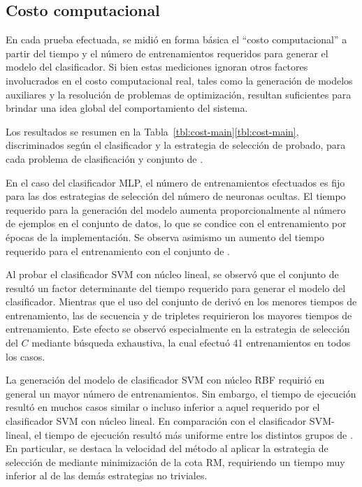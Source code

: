 %
%
\subsection{Costo computacional}
%
En cada prueba efectuada, se midió en forma básica el ``costo
computacional'' a partir del tiempo y el número de entrenamientos
requeridos para generar el modelo del clasificador.
Si bien estas mediciones ignoran otros factores involucrados en el
costo computacional real, tales como la generación de modelos
auxiliares y la resolución de problemas de optimización, resultan
suficientes para brindar una idea global del comportamiento del
sistema.

Los resultados se resumen en la
\iflatexml{}Tabla~\ref{tbl:cost-main}\else\autoref{tbl:cost-main}\fi{},
discriminados según el clasificador y la estrategia de selección de
 probado, para cada problema de clasificación y conjunto de
.

En el caso del clasificador MLP, el número de entrenamientos
efectuados es fijo para las dos estrategias de selección del número de
neuronas ocultas.
El tiempo requerido para la generación del modelo aumenta
proporcionalmente al número de ejemplos en el conjunto de datos, lo
que se condice con el entrenamiento por épocas de la implementación.
Se observa asimismo un aumento del tiempo requerido para el
entrenamiento con el conjunto de  .

Al probar el clasificador SVM con núcleo lineal, se observó que el
conjunto de  resultó un factor determinante del tiempo
requerido para generar el modelo del clasificador.
Mientras que el uso del conjunto de   derivó en los
menores tiempos de entrenamiento, las  de secuencia y de
tripletes requirieron los mayores tiempos de entrenamiento.
Este efecto se observó especialmente en la estrategia de selección del
\hparam{} $C$ mediante búsqueda exhaustiva, la cual efectuó 41
entrenamientos en todos los casos.

La generación del modelo de clasificador SVM con núcleo RBF requirió
en general un mayor número de entrenamientos.
Sin embargo, el tiempo de ejecución resultó en muchos casos similar o
incluso inferior a aquel requerido por el clasificador SVM con núcleo
lineal.
En comparación con el clasificador SVM-lineal, el tiempo de ejecución
resultó más uniforme entre los distintos grupos de .
En particular, se destaca la velocidad del método al aplicar la
estrategia de selección de  mediante minimización de la cota
RM, requiriendo un tiempo muy inferior al de las demás estrategias no
triviales.
